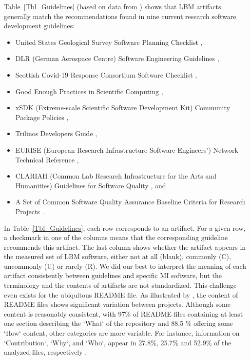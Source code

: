 \documentclass[final, 3p, times, authoryear]{elsarticle}
\begin{document}
Table~\ref{Tbl_Guidelines} (based on data from \citep{SmithAndMichalski2022}) %
shows that LBM artifacts generally match the recommendations found in nine
current research software development guidelines:
\begin{itemize}
\item United States Geological Survey Software Planning Checklist
\citep{USGS2019},
\item DLR (German Aerospace Centre) Software Engineering Guidelines
\citep{TobiasEtAl2018}, 
\item Scottish Covid-19 Response Consortium Software Checklist
\citep{BrettEtAl2021},
\item Good Enough Practices in Scientific Computing \citep{WilsonEtAl2016},
\item xSDK (Extreme-scale Scientific Software Development Kit) Community Package
Policies \citep{SmithAndRoscoe2018},
\item Trilinos Developers Guide \citep{HerouxEtAl2008},
\item EURISE (European Research Infrastructure Software Engineers') Network
Technical Reference \citep{ThielEtAl2020},
\item CLARIAH (Common Lab Research Infrastructure for the Arts and Humanities)
Guidelines for Software Quality \citep{vanGompelEtAl2016}, and
\item A Set of Common Software Quality Assurance Baseline Criteria for Research
Projects \citep{OrvizEtAl2017}.
\end{itemize}

In Table~\ref{Tbl_Guidelines}, each row corresponds to an artifact.  For a given
row, a checkmark in one of the columns means that the corresponding guideline
recommends this artifact.  The last column shows whether the artifact appears in
the measured set of LBM software, either not at all (blank), commonly (C),
uncommonly (U) or rarely (R).  We did our best to interpret the meaning of each
artifact consistently between guidelines and specific MI software, but the
terminology and the contents of artifacts are not standardized.  This challenge
even exists for the ubiquitous README file.  As illustrated by
\citet{PranaEtAl2018}, the content of README files shows significant variation
between projects.  Although some content is reasonably consistent, with 97\% of
README files containing at least one section describing the `What` of the
repository and 88.5 \% offering some `How` content, other categories are more
variable.  For instance, information on `Contribution`, `Why`, and `Who`,
appear in 27.8\%, 25.7\% and 52.9\% of the analyzed files, respectively
\citep{PranaEtAl2018}.  
\end{document}
